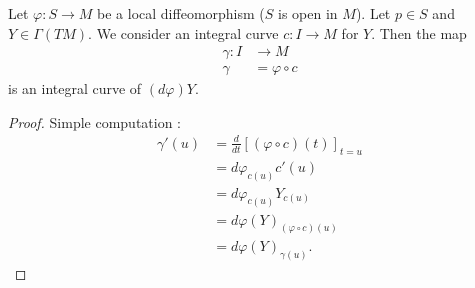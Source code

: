 \begin{lemma}	\label{LEMooMJEKooGTPcUT}
	Let \(\varphi \colon S\to M  \) be a local diffeomorphism (\( S\) is open in \( M\)). Let \( p\in S\) and \( Y\in\Gamma(TM)\). We consider an integral curve \(c \colon I\to M  \) for \( Y\). Then the map
	\begin{equation}
		\begin{aligned}
			\gamma\colon I & \to M           \\
			\gamma         & =\varphi\circ c
		\end{aligned}
	\end{equation}
	is an integral curve of \( (d\varphi)Y\).
\end{lemma}

\begin{proof}
	Simple computation :
	\begin{subequations}
		\begin{align}
			\gamma'(u) & =\frac{d}{dt} \left[ (\varphi\circ c)(t)  \right]_{t=u} \\
			           & =d\varphi_{c(u)}c'(u)                                   \\
			           & =d\varphi_{c(u)}Y_{c(u)}                                \\
			           & =d\varphi(Y)_{(\varphi\circ c)(u)}                      \\
			           & =d\varphi(Y)_{\gamma(u)}.
		\end{align}
	\end{subequations}
\end{proof}


